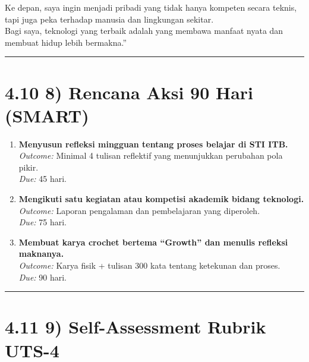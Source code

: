 \documentclass[
  letterpaper,
  DIV=11,
  numbers=noendperiod]{scrreprt}
\begin{document}
Ke depan, saya ingin menjadi pribadi yang tidak hanya kompeten secara
teknis, tapi juga peka terhadap manusia dan lingkungan sekitar.\\
Bagi saya, teknologi yang terbaik adalah yang membawa manfaat nyata dan
membuat hidup lebih bermakna.''

\begin{center}\rule{0.5\linewidth}{0.5pt}\end{center}

\section{4.10 8) Rencana Aksi 90 Hari
(SMART)}\label{rencana-aksi-90-hari-smart}

\begin{enumerate}
\def\labelenumi{\arabic{enumi}.}
\item
  \textbf{Menyusun refleksi mingguan tentang proses belajar di STI
  ITB.}\\
  \emph{Outcome:} Minimal 4 tulisan reflektif yang menunjukkan perubahan
  pola pikir.\\
  \emph{Due:} 45 hari.
\item
  \textbf{Mengikuti satu kegiatan atau kompetisi akademik bidang
  teknologi.}\\
  \emph{Outcome:} Laporan pengalaman dan pembelajaran yang diperoleh.\\
  \emph{Due:} 75 hari.
\item
  \textbf{Membuat karya crochet bertema ``Growth'' dan menulis refleksi
  maknanya.}\\
  \emph{Outcome:} Karya fisik + tulisan 300 kata tentang ketekunan dan
  proses.\\
  \emph{Due:} 90 hari.
\end{enumerate}

\begin{center}\rule{0.5\linewidth}{0.5pt}\end{center}

\section{4.11 9) Self-Assessment Rubrik
UTS-4}\label{self-assessment-rubrik-uts-4}
\end{document}
